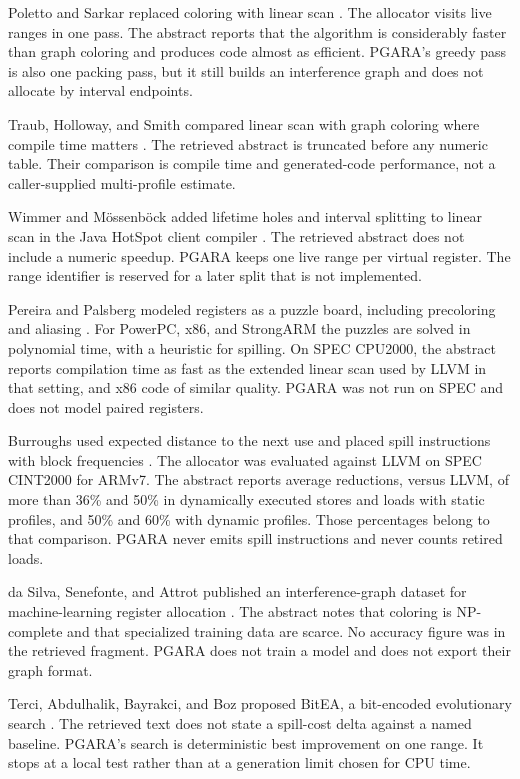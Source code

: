 \documentclass{ieeeaccess}
\begin{document}
Poletto and Sarkar replaced coloring with linear scan \cite{poletto1999}.
The allocator visits live ranges in one pass.
The abstract reports that the algorithm is considerably faster than graph coloring and produces code almost as efficient.
PGARA's greedy pass is also one packing pass, but it still builds an interference graph and does not allocate by interval endpoints.

Traub, Holloway, and Smith compared linear scan with graph coloring where compile time matters \cite{traub1998}.
The retrieved abstract is truncated before any numeric table.
Their comparison is compile time and generated-code performance, not a caller-supplied multi-profile estimate.

Wimmer and M\"ossenb\"ock added lifetime holes and interval splitting to linear scan in the Java HotSpot client compiler \cite{wimmer2005}.
The retrieved abstract does not include a numeric speedup.
PGARA keeps one live range per virtual register.
The range identifier is reserved for a later split that is not implemented.

Pereira and Palsberg modeled registers as a puzzle board, including precoloring and aliasing \cite{pereira2008}.
For PowerPC, x86, and StrongARM the puzzles are solved in polynomial time, with a heuristic for spilling.
On SPEC CPU2000, the abstract reports compilation time as fast as the extended linear scan used by LLVM in that setting, and x86 code of similar quality.
PGARA was not run on SPEC and does not model paired registers.

Burroughs used expected distance to the next use and placed spill instructions with block frequencies \cite{burroughs2016}.
The allocator was evaluated against LLVM on SPEC CINT2000 for ARMv7.
The abstract reports average reductions, versus LLVM, of more than 36\% and 50\% in dynamically executed stores and loads with static profiles, and 50\% and 60\% with dynamic profiles.
Those percentages belong to that comparison.
PGARA never emits spill instructions and never counts retired loads.

da Silva, Senefonte, and Attrot published an interference-graph dataset for machine-learning register allocation \cite{silva2024}.
The abstract notes that coloring is NP-complete and that specialized training data are scarce.
No accuracy figure was in the retrieved fragment.
PGARA does not train a model and does not export their graph format.

Terci, Abdulhalik, Bayrakci, and Boz proposed BitEA, a bit-encoded evolutionary search \cite{terci2024}.
The retrieved text does not state a spill-cost delta against a named baseline.
PGARA's search is deterministic best improvement on one range.
It stops at a local test rather than at a generation limit chosen for CPU time.
\end{document}
